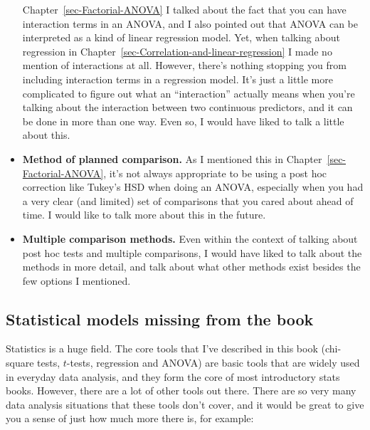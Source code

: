 \documentclass[
  a4paper,
]{book}
\begin{document}
\begin{itemize}
  Chapter~\ref{sec-Factorial-ANOVA} I talked about the fact that you can
  have interaction terms in an ANOVA, and I also pointed out that ANOVA
  can be interpreted as a kind of linear regression model. Yet, when
  talking about regression in
  Chapter~\ref{sec-Correlation-and-linear-regression} I made no mention
  of interactions at all. However, there's nothing stopping you from
  including interaction terms in a regression model. It's just a little
  more complicated to figure out what an ``interaction'' actually means
  when you're talking about the interaction between two continuous
  predictors, and it can be done in more than one way. Even so, I would
  have liked to talk a little about this.
\item
  \textbf{Method of planned comparison.} As I mentioned this in
  Chapter~\ref{sec-Factorial-ANOVA}, it's not always appropriate to be
  using a post hoc correction like Tukey's HSD when doing an ANOVA,
  especially when you had a very clear (and limited) set of comparisons
  that you cared about ahead of time. I would like to talk more about
  this in the future.
\item
  \textbf{Multiple comparison methods.} Even within the context of
  talking about post hoc tests and multiple comparisons, I would have
  liked to talk about the methods in more detail, and talk about what
  other methods exist besides the few options I mentioned.
\end{itemize}

\hypertarget{statistical-models-missing-from-the-book}{%
\subsection*{Statistical models missing from the
book}\label{statistical-models-missing-from-the-book}}

Statistics is a huge field. The core tools that I've described in this
book (chi-square tests, \(t\)-tests, regression and ANOVA) are basic
tools that are widely used in everyday data analysis, and they form the
core of most introductory stats books. However, there are a lot of other
tools out there. There are so very many data analysis situations that
these tools don't cover, and it would be great to give you a sense of
just how much more there is, for example:
\end{document}
